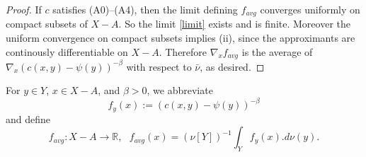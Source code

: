 \documentclass[12pt]{amsart}
\theoremstyle{definition}
\theoremstyle{remark}
\newcommand{\bR}{\mathbb{R}}
\begin{document}
\begin{proof}
If $c$ satisfies (A0)--(A4), then the limit defining $f_{avg}$ converges uniformly on compact subsets of $X-A$. So the limit \eqref{limit} exists and is finite. Moreover the uniform convergence on compact subsets implies (ii), since the approximants are continously differentiable on $X-A$. Therefore $\nabla_x f_{avg}$ is the average of $\nabla_x (c(x,y)-\psi(y))^{-\beta}$ with respect to $\bar{\nu}$, as desired.  
\end{proof}












For $y\in Y$, $x\in X-A$, and $\beta>0$, we abbreviate 
\begin{equation}\label{fy} f_y(x):=(c(x,y)-\psi(y))^{-\beta} \end{equation} and define \begin{equation}\label{favgdef}
f_{avg}: X-A \to \bR, ~~~f_{avg}(x)=(\nu[Y])^{-1} \int_Y f_y(x).d\nu(y).
\end{equation}
\end{document}
